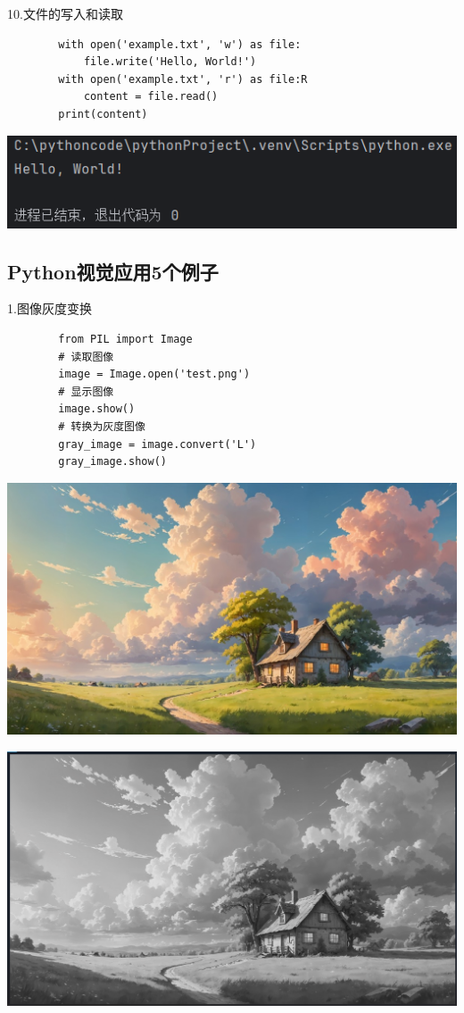 \documentclass{article}
\begin{document}
	
	10.文件的写入和读取
	\begin{verbatim}
		with open('example.txt', 'w') as file:
			file.write('Hello, World!')
		with open('example.txt', 'r') as file:R
			content = file.read()
		print(content)
	\end{verbatim}
	
	
	\noindent
	\begin{minipage}{\linewidth}
		\centering
		\includegraphics[width=0.5\linewidth]{example10.png}
		\label{fig:example}
	\end{minipage}
	
	
	
	\subsection{Python视觉应用5个例子}
	1.图像灰度变换
	\begin{verbatim}
		from PIL import Image
		# 读取图像
		image = Image.open('test.png') 
		# 显示图像
		image.show()
		# 转换为灰度图像
		gray_image = image.convert('L')
		gray_image.show()
	\end{verbatim}
	
	\noindent
	\begin{minipage}{\linewidth}
		\centering
		\includegraphics[width=0.5\linewidth]{test.png}
		\label{fig:example}
	\end{minipage}
	
	\noindent
	\begin{minipage}{\linewidth}
		\centering
		\includegraphics[width=0.5\linewidth]{completed.png}
		\label{fig:example}
	\end{minipage}
	
\end{document}
